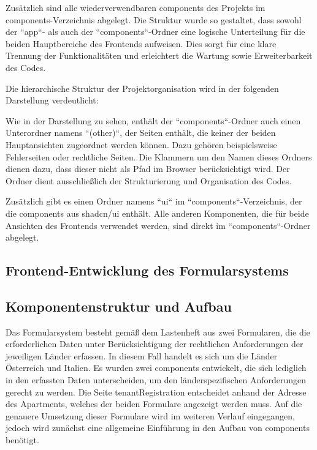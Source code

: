 Zusätzlich sind alle wiederverwendbaren \gls{components} des Projekts im components-Verzeichnis abgelegt. Die Struktur wurde so gestaltet, dass sowohl der ``app``- als auch der ``components``-Ordner eine logische Unterteilung für die beiden Hauptbereiche des Frontends aufweisen. Dies sorgt für eine klare Trennung der Funktionalitäten und erleichtert die Wartung sowie Erweiterbarkeit des Codes. \cite{prompt23_pollak}

Die hierarchische Struktur der Projektorganisation wird in der folgenden Darstellung verdeutlicht:


Wie in der Darstellung zu sehen, enthält der ``components``-Ordner auch einen Unterordner namens ``(other)``, der Seiten enthält, die keiner der beiden Hauptansichten zugeordnet werden können. Dazu gehören beispielsweise Fehlerseiten oder rechtliche Seiten. Die Klammern um den Namen dieses Ordners dienen dazu, dass dieser nicht als Pfad im Browser berücksichtigt wird. Der Ordner dient ausschließlich der Strukturierung und Organisation des Codes.

Zusätzlich gibt es einen Ordner namens ``ui`` im ``components``-Verzeichnis, der die \gls{components} aus shadcn/ui enthält. Alle anderen Komponenten, die für beide Ansichten des Frontends verwendet werden, sind direkt im ``components``-Ordner abgelegt.

\subsection{Frontend-Entwicklung des Formularsystems}
\subsection{Komponentenstruktur und Aufbau}
Das Formularsystem besteht gemäß dem Lastenheft aus zwei Formularen, die die erforderlichen Daten unter Berücksichtigung der rechtlichen Anforderungen der jeweiligen Länder erfassen. In diesem Fall handelt es sich um die Länder Österreich und Italien. Es wurden zwei \gls{components} entwickelt, die sich lediglich in den erfassten Daten unterscheiden, um den länderspezifischen Anforderungen gerecht zu werden.
Die Seite tenantRegistration entscheidet anhand der Adresse des Apartments, welches der beiden Formulare angezeigt werden muss. Auf die genauere Umsetzung dieser Formulare wird im weiteren Verlauf eingegangen, jedoch wird zunächst eine allgemeine Einführung in den Aufbau von \gls{components} benötigt.\cite{prompt24_pollak}

